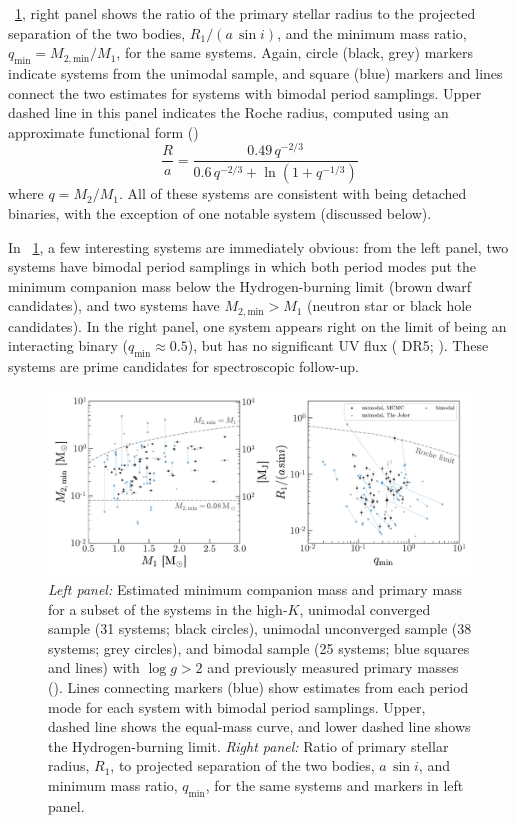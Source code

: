 \documentclass[modern, letterpaper]{aastex62}
\newcommand{\logg}{\ensuremath{\log g}}
\begin{document}
\figurename~\ref{fig:mass}, right panel shows the ratio of the primary stellar
radius to the projected separation of the two bodies, $R_1 / (a\,\sin i)$, and
the minimum mass ratio, $q_{\textrm{min}} = M_{2, \textrm{min}} / M_1$, for the
same systems.
Again, circle (black, grey) markers indicate systems from the unimodal sample,
and square (blue) markers and lines connect the two estimates for systems with
bimodal period samplings.
Upper dashed line in this panel indicates the Roche radius, computed using an
approximate functional form (\citealt{Eggleton:1983})
\begin{equation}
    \frac{R}{a} = \frac{0.49\,q^{-2/3}}{0.6\,q^{-2/3} +
        \ln\left(1 + q^{-1/3}\right)}
\end{equation}
where $q = M_2 / M_1$.
All of these systems are consistent with being detached binaries, with the
exception of one notable system (discussed below).

In \figurename~\ref{fig:mass}, a few interesting systems are immediately
obvious: from the left panel, two systems have bimodal period samplings in which
both period modes put the minimum companion mass below the Hydrogen-burning
limit (brown dwarf candidates), and two systems have $M_{2, \textrm{min}} > M_1$
(neutron star or black hole candidates).
In the right panel, one system appears right on the limit of being an
interacting binary ($q_{\textrm{min}} \approx 0.5$), but has no significant UV
flux ( DR5; \citealt{Bianchi:2011}).
These systems are prime candidates for spectroscopic follow-up.

\begin{figure}[h]
\begin{center}
\includegraphics[width=\textwidth]{mass}
\end{center}
\caption{%
\textit{Left panel:} Estimated minimum companion mass and primary mass for a
subset of the systems in the high-$K$, unimodal converged sample (31 systems;
black circles), unimodal unconverged sample (38 systems; grey circles), and
bimodal sample (25 systems; blue squares and lines) with $\logg > 2$ and
previously measured primary masses (\citealt{Ness:2015}).
Lines connecting markers (blue) show estimates from each period mode for each
system with bimodal period samplings.
Upper, dashed line shows the equal-mass curve, and lower dashed line shows the
Hydrogen-burning limit.
\textit{Right panel:} Ratio of primary stellar radius, $R_1$, to projected
separation of the two bodies, $a\,\sin i$, and minimum mass ratio,
$q_{\textrm{min}}$, for the same systems and markers in left panel.
\label{fig:mass}
}
\end{figure}
\end{document}
